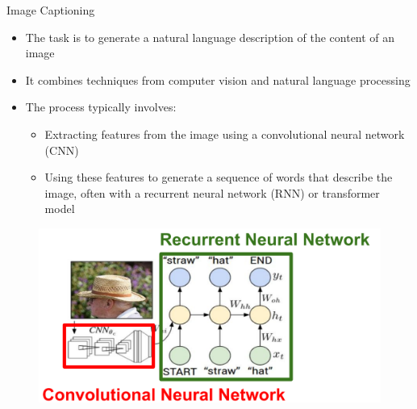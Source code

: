 \begin{frame}[allowframebreaks]{Image Captioning}
\framebreak
    \begin{itemize}
        \item The task is to generate a natural language description of the content of an image
        \item It combines techniques from computer vision and natural language processing
        \item The process typically involves:
        \begin{itemize}
            \item Extracting features from the image using a convolutional neural network (CNN)
            \item Using these features to generate a sequence of words that describe the image, often with a recurrent neural network (RNN) or transformer model
        \end{itemize}
    \end{itemize}
\framebreak
    \begin{figure}
        \centering
        \includegraphics[width=1.0\textwidth,height=1.0\textheight,keepaspectratio]{images/advanced-cv/cap_2.png}
    \end{figure}  
\end{frame}